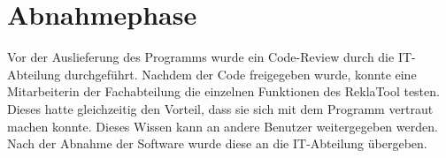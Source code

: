 \section{Abnahmephase} 
\label{sec:Abnahmephase}
Vor der Auslieferung des Programms wurde ein Code-Review durch die IT-Abteilung durchgeführt.
Nachdem der Code freigegeben wurde, konnte eine Mitarbeiterin der Fachabteilung die einzelnen
Funktionen des ReklaTool testen. Dieses hatte gleichzeitig den Vorteil, dass sie sich mit dem
Programm vertraut machen konnte. Dieses Wissen kann an andere Benutzer weitergegeben werden.
Nach der Abnahme der Software wurde diese an die IT-Abteilung übergeben.